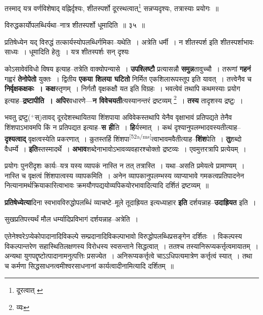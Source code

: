 \documentclass[article,12pt,a4paper]{memoir}
\newcommand{\add}[1]{($^{+}$#1)}
\begin{document}
	  \pstart तस्माद् यत्र वर्णविशेषाद् वह्निर्दृश्यः, शीतस्पर्शो दूरस्थत्वात्\footnote{दूरत्वात् \cite{dp-msB} \cite{dp-msD}} सन्नप्यदृश्यः, तत्रास्याः प्रयोगः ॥
	\pend
       

	  \pstart विरुद्धकार्योपलब्धिर्यथा--नात्र शीतस्पर्शो धूमादिति ॥ ३५ ॥
	\pend
       

	  \pstart प्रतिषेध्येन यद् विरुद्धं तत्कार्यस्योपलब्धिर्गमिका--यथेति । अत्रेति धर्मी । न शीतस्पर्श इति शीतस्पर्शाभावः साध्यः । धूमादिति हेतुः । यत्र शीतस्पर्शः सन् दृश्यः
	\pend
      

	  \pstart कोऽसावेवंविधो विषय इत्याह--तत्रेति वाक्योपन्यासे । \textbf{उपश्लिष्टौ} प्रत्यासन्नौ \textbf{समुन्न}तावुच्चौ । तरूणां \textbf{गहनं} गह्वरं \textbf{तेनोपेतो} युक्तः । द्वितीय \textbf{एकया शिलया घटितो} निर्मित एकशिलारूपस्तूप इति यावत् । तत्त्वेनैव च \textbf{निर्वृक्षकक्षकः । कक्ष}स्तृणम् । निर्गतौ वृक्षकक्षौ यत इति विग्रहः । भवत्वेवं तथापि कथमस्याः प्रयोग इत्याह--\textbf{द्रष्टापीति । अपिर}वधारणे—\textbf{न विवेचयती}त्यस्यानन्तरं द्रष्टव्यम् \footnote{व्यः} । \textbf{तस्य} तादृशस्य द्रष्टुः ।
	\pend
      

	  \pstart भवतु द्रष्टु\add{स्}तावद् दूरदेशस्थायितया शिंशपाया अविवेकस्तथापि येनैव वृक्षाभावं प्रतिपद्यते तेनैव शिंशपाऽभावमपि किं न प्रतिपद्यत इत्याह--\textbf{स ही}ति । \textbf{हि}र्यस्मात् । कथं दृश्यानुपलम्भादवस्यतीत्याह--\textbf{दृश्यत्वाद्} वृक्षत्वस्येति प्रकरणात् । कुतस्तर्हि शिंशपा\leavevmode\textsuperscript{\rmlatinfont\tiny [52a/ms]}त्वाभावमवैतीत्याह--\textbf{शिंश}पेति । \textbf{तु}शब्दो वैधर्म्ये । \textbf{इति}स्तस्मादर्थे । \textbf{अभाव}शब्देनाभावोऽभावव्यवहारश्चोक्तो द्रष्टव्यः । एवमुत्तरत्रापि प्रत्येयम् ।
	\pend
      

	  \pstart प्रयोगः पुनरीदृशः कार्यः--यत्र यस्य व्यापकं नास्ति न तत् तत्रास्ति । यथा--असति प्रमेयत्वे प्रामाण्यम् । नास्ति च वृक्षत्वं शिंशपात्वस्य व्यापकमिति । अनेन व्यापकानुपलम्भस्य व्याप्याभावे गमकत्वप्रतिपादनेन नित्यानामर्थक्रियाकारित्वाभावः क्रमयौगपद्ययोव्यपिकयोरभावादित्यादि दर्शितं द्रष्टव्यम् ॥
	\pend
      

	  \pstart \textbf{प्रतिषेध्येत्या}दिना स्वभावविरुद्धोपलब्धिं व्याचष्टे--मूले तूदाह्रियत इत्यध्याहार \textbf{इति} दर्शयन्नाह--\textbf{उदाह्रियत} इति ।
	\pend
      

	  \pstart सुखप्रतिपत्त्यर्थं मौल धर्म्यादिप्रविभागं दर्शयन्नाह--अत्रेति ।
	\pend
      

	  \pstart एतेनेश्वरेऽप्येकोपादानादिविकल्पे सम्प्रदानादिविकल्पाभावो विरुद्धोपलब्धिप्रसङ्गेन दर्शितः । विकल्पस्य विकल्पान्तरेण सहास्थितिलक्षणस्य विरोधस्य स्वसन्ताने सिद्धत्वात् । ततश्च तस्यानिरूप्यकर्त्तृत्वमायातम् । अन्यथा युगपद्दृष्टोत्पादानामनुत्पत्तिः प्रसज्येत । अनिरूप्यकर्त्तृत्वे चाऽऽधिपत्यमात्रेण कर्त्तृत्वं स्यात् । तथा च कर्मणा सिद्धसाधनत्वमीश्वरसाधनानां कार्यत्वादीनामित्यादि दर्शितम् ॥
	\pend
      
\end{document}
